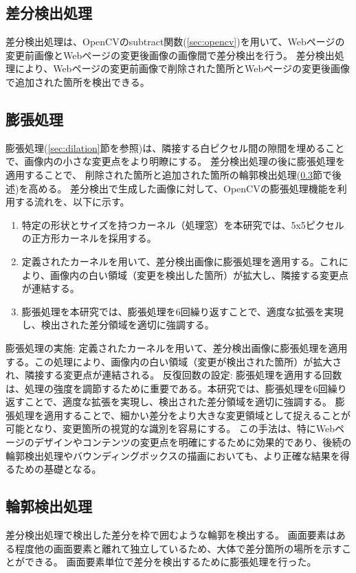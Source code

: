 \subsection{差分検出処理}\label{subsec:difference_detection_process}
差分検出処理は、OpenCVのsubtract関数(\ref{sec:opencv})を用いて、Webページの変更前画像とWebページの変更後画像の画像間で差分検出を行う。
差分検出処理により、Webページの変更前画像で削除された箇所とWebページの変更後画像で追加された箇所を検出できる。


\subsection{膨張処理}\label{subsec:dilation}
膨張処理(\ref{sec:dilation}節を参照)は、隣接する白ピクセル間の隙間を埋めることで、画像内の小さな変更点をより明瞭にする。
差分検出処理の後に膨張処理を適用することで、
削除された箇所と追加された箇所の輪郭検出処理(\ref{subsec:contour_detection_processing}節で後述)を高める。
差分検出で生成した画像に対して、OpenCVの膨張処理機能を利用する流れを、以下に示す。
\begin{enumerate}
    \item 特定の形状とサイズを持つカーネル（処理窓）を本研究では、5x5ピクセルの正方形カーネルを採用する。
    \item 定義されたカーネルを用いて、差分検出画像に膨張処理を適用する。これにより、画像内の白い領域（変更を検出した箇所）が拡大し、隣接する変更点が連結する。
    \item 膨張処理を本研究では、膨張処理を6回繰り返すことで、適度な拡張を実現し、検出された差分領域を適切に強調する。
\end{enumerate}

膨張処理の実施: 定義されたカーネルを用いて、差分検出画像に膨張処理を適用する。この処理により、画像内の白い領域（変更が検出された箇所）が拡大され、隣接する変更点が連結される。
反復回数の設定: 膨張処理を適用する回数は、処理の強度を調節するために重要である。本研究では、膨張処理を6回繰り返すことで、適度な拡張を実現し、検出された差分領域を適切に強調する。
膨張処理を適用することで、細かい差分をより大きな変更領域として捉えることが可能となり、変更箇所の視覚的な識別を容易にする。
この手法は、特にWebページのデザインやコンテンツの変更点を明確にするために効果的であり、後続の輪郭検出処理やバウンディングボックスの描画においても、より正確な結果を得るための基礎となる。

\subsection{輪郭検出処理}\label{subsec:contour_detection_processing}
差分検出処理で検出した差分を枠で囲むような輪郭を検出する。
画面要素はある程度他の画面要素と離れて独立しているため、大体で差分箇所の場所を示すことができる。
画面要素単位で差分を検出するために膨張処理を行った。

